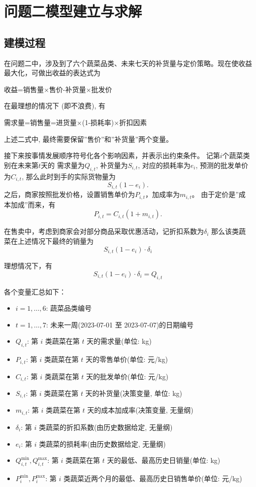 \documentclass{cumcmthesis}
\begin{document}
\section{问题二模型建立与求解}%

\subsection{建模过程}
在问题二中，涉及到了六个蔬菜品类、未来七天的补货量与定价策略。现在使收益最大化，可做出收益的表达式为

\begin{center}     
收益=销售量$\times$售价-补货量$\times$批发价
\end{center}

在最理想的情况下 (即不浪费), 有

\begin{center}  
需求量=销售量=进货量$\times$(1-损耗率)$\times$折扣因素
\end{center}   

上述二式中, 最终需要保留''售价''和''补货量''两个变量。

接下来按事情发展顺序符号化各个影响因素，并表示出约束条件。
记第$i$个蔬菜类别在未来第$t$天的
需求量为$Q_{i,t}$, 
补货量为$S_{i,t}$, 
对应的损耗率为$e_i$, 
预测的批发单价为$C_{i,t}$, 
那么此时到手的实际货物量为
\[
S_{i,t}(1-e_i).
\]
之后，商家按照批发价格，设置销售单价为$P_{i,t}$，加成率为$m_{i,t}$。
由于定价是''成本加成''而来，有
\[
P_{i,t}=C_{i,t}(1+m_{i,t}).
\]

在售卖中，考虑到商家会对部分商品采取优惠活动，记折扣系数为$\delta_i$
那么该类蔬菜在上述情况下最终的销量为
\[
    S_{i,t}(1-e_i) \cdot  \delta_i
\]

理想情况下，有
\[
S_{i,t}(1-e_i) \cdot  \delta_i=Q_{i,t}
\]

各个变量汇总如下：

\begin{itemize}
\item $i = 1,\dots,6$: 蔬菜品类编号
\item $t = 1,\dots,7$: 未来一周(2023-07-01 至 2023-07-07)的日期编号
\item $Q_{i,t}$: 第 $i$ 类蔬菜在第 $t$ 天的需求量(单位: kg)
\item $P_{i,t}$: 第 $i$ 类蔬菜在第 $t$ 天的零售单价(单位: 元/kg)
\item $C_{i,t}$: 第 $i$ 类蔬菜在第 $t$ 天的批发单价(单位: 元/kg)
\item $S_{i,t}$: 第 $i$ 类蔬菜在第 $t$ 天的补货量(决策变量, 单位: kg)
\item $m_{i,t}$: 第 $i$ 类蔬菜在第 $t$ 天的成本加成率(决策变量, 无量纲)
     
\item $\delta_i$: 第 $i$ 类蔬菜的折扣系数(由历史数据给定, 无量纲)
\item $e_i$: 第 $i$ 类蔬菜的损耗率(由历史数据给定, 无量纲)
\item $Q_{i,t}^{\min}, Q_{i,t}^{\max}$: 第 $i$ 类蔬菜在第 $t$ 天的最低、最高历史日销量(单位: kg)
\item $P_{i}^{\min}, P_{i}^{\max}$: 第 $i$ 类蔬菜近两个月的最低、最高历史日销售单价(单位: 元/kg)
\end{itemize}
\end{document}
